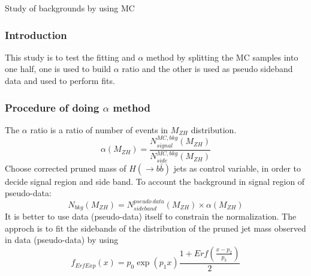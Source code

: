 \documentclass[7pt,aspectratio=1610]{beamer}
\renewcommand{\arraystretch}{1.2}
\begin{document}
\begin{frame}
  \LARGE{\centerline{Study of backgrounds by using MC}}
\end{frame}
\begin{frame}
  \frametitle{Introduction}
  \justifying
  \begin{footnotesize}
    This study is to test the fitting and $\alpha$ method by splitting the MC samples into one half, one is used to build $\alpha$ ratio and the other is used as
    pseudo sideband data and used to perform fits.
  \end{footnotesize}
\end{frame}
\begin{frame}
  \frametitle{Procedure of doing $\alpha$ method}
  \justifying
  \begin{footnotesize}
    The $\alpha$ ratio is a ratio of number of events in $M_{ZH}$ distribution.
    \begin{equation}
      \alpha(M_{ZH}) = \frac{N^{MC,bkg}_{signal}(M_{ZH})}{N^{MC,bkg}_{side}(M_{ZH})}
    \end{equation}
    Choose corrected pruned mass of $H (\rightarrow b\bar{b})$ jets as control variable, in order to decide signal region and side band.
    To account the background in signal region of pseudo-data:
    \begin{equation}
      N_{bkg}(M_{ZH}) = N^{pseudo\ data}_{sideband}(M_{ZH})\times \alpha(M_{ZH})
    \end{equation}
    It is better to use data (pseudo-data) itself to constrain the normalization.
    The approch is to fit the sidebands of the distribution of the pruned jet mass observed in data (pseudo-data) by using
    \begin{equation}
      f_{ErfExp}(x) = p_0\exp(p_1x)\frac{1+Erf(\frac{x-p_2}{p_3})}{2}
    \end{equation}
  \end{footnotesize}
\end{frame}
\renewcommand{\arraystretch}{1.1}
\end{document}
